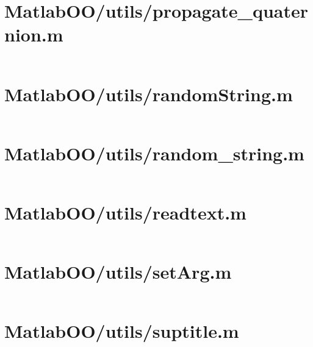 \pagebreak
\section{MatlabOO/utils/propagate\_quaternion.m}\label{code:MatlabOO/utils/propagate_quaternion.m}
\inputminted[linenos,fontsize=\scriptsize]{matlab}{/home/dcouture/git/mathyourlife/TSatPy/beta_versions/matlab_object_oriented/utils/propagate_quaternion.m}

\pagebreak
\section{MatlabOO/utils/randomString.m}\label{code:MatlabOO/utils/randomString.m}
\inputminted[linenos,fontsize=\scriptsize]{matlab}{/home/dcouture/git/mathyourlife/TSatPy/beta_versions/matlab_object_oriented/utils/randomString.m}

\pagebreak
\section{MatlabOO/utils/random\_string.m}\label{code:MatlabOO/utils/random_string.m}
\inputminted[mathescape,linenos,fontsize=\scriptsize]{matlab}{/home/dcouture/git/mathyourlife/TSatPy/beta_versions/matlab_object_oriented/utils/random_string.m}

\pagebreak
\section{MatlabOO/utils/readtext.m}\label{code:MatlabOO/utils/readtext.m}
\inputminted[linenos,fontsize=\scriptsize]{matlab}{/home/dcouture/git/mathyourlife/TSatPy/beta_versions/matlab_object_oriented/utils/readtext.m}

\pagebreak
\section{MatlabOO/utils/setArg.m}\label{code:MatlabOO/utils/setArg.m}
\inputminted[linenos,fontsize=\scriptsize]{matlab}{/home/dcouture/git/mathyourlife/TSatPy/beta_versions/matlab_object_oriented/utils/setArg.m}

\pagebreak
\section{MatlabOO/utils/suptitle.m}\label{code:MatlabOO/utils/suptitle.m}
\inputminted[linenos,fontsize=\scriptsize]{matlab}{/home/dcouture/git/mathyourlife/TSatPy/beta_versions/matlab_object_oriented/utils/suptitle.m}

